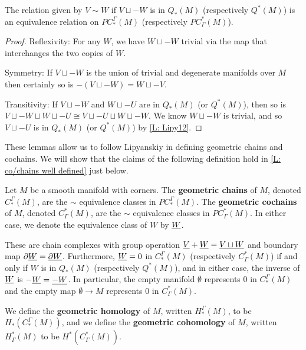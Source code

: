 \begin{lemma}\label{L: cancel Q}
	The relation given by $V\sim W$ if $V \sqcup -W$ is in $Q_*(M)$ (respectively $Q^*(M)$) is an equivalence relation on $PC^\Gamma_*(M)$ (respectively $PC_\Gamma^*(M)$).
\end{lemma}

\begin{proof}
	Reflexivity: For any $W$, we have $W \sqcup -W$ trivial via the map that interchanges the two copies of $W$.

	Symmetry: If $V \sqcup -W$ is the union of trivial and degenerate manifolds over $M$ then certainly so is $-(V \sqcup -W) = W \sqcup -V$.

	Transitivity: If $V \sqcup -W$ and $W \sqcup -U$ are in $Q_*(M)$ (or $Q^*(M)$), then so is $V \sqcup -W \sqcup W \sqcup -U \cong V \sqcup -U \sqcup W \sqcup -W$.
	We know $W \sqcup -W$ is trivial, and so $V \sqcup -U$ is in $Q_*(M)$ (or $Q^*(M)$) by \cref{L: Lipy12}.
\end{proof}

These lemmas allow us to follow Lipyanskiy in defining geometric chains and cochains.
We will show that the claims of the following definition hold in \cref{L: co/chains well defined} just below.

\begin{definition}\label{D: chains and cochains}
	Let $M$ be a smooth manifold with corners.
	The \textbf{geometric chains} of $M$, denoted $C^\Gamma_*(M)$, are the $\sim$ equivalence classes in $PC^\Gamma_*(M)$.
	The \textbf{geometric cochains} of $M$, denoted $C_\Gamma^*(M)$, are the $\sim$ equivalence classes in $PC_\Gamma^*(M)$.
	In either case, we denote the equivalence class of $W$ by $\underline{W}$.

	These are chain complexes with group operation $\underline{V} + \underline{W} = \underline{V \sqcup W}$ and boundary map $\partial \underline{W} = \underline{\partial W}$.
	Furthermore, $\underline{W} = 0$ in $C^\Gamma_*(M)$ (respectively $C_\Gamma^*(M)$) if and only if $W$ is in $Q_*(M)$ (respectively $Q^*(M)$), and in either case, the inverse of $\underline{W}$ is $-\underline{W} = \underline{-W}$.
	In particular, the empty manifold $\emptyset$ represents $0$ in $C^\Gamma_*(M)$ and the empty map $\emptyset \to M$ represents $0$ in $C^*_\Gamma(M)$.

	We define the \textbf{geometric homology} of $M$, written $H_*^\Gamma(M)$, to be $H_*(C^\Gamma_*(M))$, and
	we define the \textbf{geometric cohomology} of $M$, written $H^*_\Gamma(M)$ to be $H^*(C_\Gamma^*(M))$.
\end{definition}

